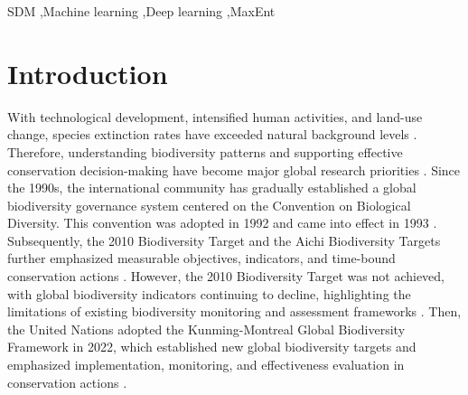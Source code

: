 \documentclass[authoryear,preprint,review,12pt]{elsarticle}
\begin{document}
\begin{frontmatter}
\begin{abstract}
\end{abstract}



\begin{keyword}
SDM \sep Machine learning \sep Deep learning \sep MaxEnt



\end{keyword}


\end{frontmatter}





\section{Introduction}
\label{introduction}

With technological development, intensified human activities, and land-use change, species extinction rates have exceeded natural background levels \citep{ceballos2017biological}. Therefore, understanding biodiversity patterns and supporting effective conservation decision-making have become major global research priorities \citep{maxwell2016biodiversity}. Since the 1990s, the international community has gradually established a global biodiversity governance system centered on the Convention on Biological Diversity. This convention was adopted in 1992 and came into effect in 1993 \citep{CBD1993}. Subsequently, the 2010 Biodiversity Target and the Aichi Biodiversity Targets further emphasized measurable objectives, indicators, and time-bound conservation actions \citep{CBD2010}. However, the 2010 Biodiversity Target was not achieved, with global biodiversity indicators continuing to decline, highlighting the limitations of existing biodiversity monitoring and assessment frameworks \citep{butchart2010global}. Then, the United Nations adopted the Kunming-Montreal Global Biodiversity Framework in 2022, which established new global biodiversity targets and emphasized implementation, monitoring, and effectiveness evaluation in conservation actions \citep{CBD2022}.
\end{document}
